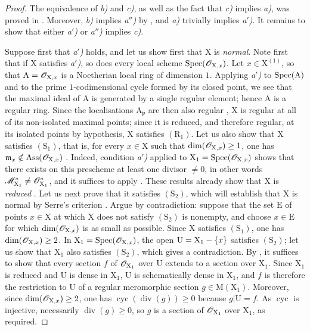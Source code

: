 \begin{proof}
The equivalence of \emph{b)} and \emph{c)}, as well as the fact that \emph{c)} implies \emph{a)}, was proved in .
Moreover, \emph{b)} implies \emph{a$''$)} by , and \emph{a)} trivially implies \emph{a$'$)}.
It remains to show that either \emph{a$'$)} or \emph{a$''$)} implies \emph{c)}.

Suppose first that \emph{a$'$)} holds, and let us show first that $\mathrm{X}$ is \emph{normal}.
Note first that if $\mathrm{X}$ satisfies \emph{a$'$)}, so does every local scheme $\operatorname{Spec}(\mathscr{O}_{\mathrm{X},x})$.
Let $x\in\mathrm{X}^{(1)}$, so that $\mathrm{A}=\mathscr{O}_{\mathrm{X},x}$ is a Noetherian local ring of dimension $1$.
Applying \emph{a$'$)} to $\operatorname{Spec}(\mathrm{A})$ and to the prime $1$-codimensional cycle formed by its closed point, we see that the maximal ideal of $\mathrm{A}$ is generated by a single regular element; hence  $\mathrm{A}$ is a regular ring.
Since the localisations $\mathrm{A}_{\mathfrak p}$ are then also regular , $\mathrm{X}$ is regular at all of its non-isolated maximal points; since it is reduced, and therefore regular, at its isolated points by hypothesis, $\mathrm{X}$ satisfies $(\mathrm{R}_1)$.
Let us also show that $\mathrm{X}$ satisfies $(\mathrm{S}_1)$, that is, for every $x\in\mathrm{X}$ such that $\dim(\mathscr{O}_{\mathrm{X},x})\geq 1$, one has $\mathfrak m_x\notin\operatorname{Ass}(\mathscr{O}_{\mathrm{X},x})$ .
Indeed, condition \emph{a$'$)} applied to $\mathrm{X}_1=\operatorname{Spec}(\mathscr{O}_{\mathrm{X},x})$ shows that there exists on this prescheme at least one divisor $\neq 0$, in other words $\mathscr{M}_{\mathrm{X}_1}^*\neq\mathscr{O}_{\mathrm{X}_1}^*$, and it suffices to apply .
These results already show that $\mathrm{X}$ is \emph{reduced} .
Let us next prove that it satisfies $(\mathrm{S}_2)$, which will establish that $\mathrm{X}$ is normal by Serre's criterion .
Argue by contradiction: suppose that the set $\mathrm{E}$ of points $x\in\mathrm{X}$ at which $\mathrm{X}$ does not satisfy $(\mathrm{S}_2)$ is nonempty, and choose $x\in\mathrm{E}$ for which $\dim(\mathscr{O}_{\mathrm{X},x})$ is as small as possible.
Since $\mathrm{X}$ satisfies $(\mathrm{S}_1)$, one has $\dim(\mathscr{O}_{\mathrm{X},x})\geq 2$.
In $\mathrm{X}_1=\operatorname{Spec}(\mathscr{O}_{\mathrm{X},x})$, the open $\mathrm{U}=\mathrm{X}_1-\{x\}$ satisfies $(\mathrm{S}_2)$; let us show that $\mathrm{X}_1$ also satisfies $(\mathrm{S}_2)$, which gives a contradiction.
By , it suffices to show that every section $f$ of $\mathscr{O}_{\mathrm{X}_1}$ over $\mathrm{U}$ extends to a section over $\mathrm{X}_1$.
Since $\mathrm{X}_1$ is reduced and $\mathrm{U}$ is dense in $\mathrm{X}_1$, $\mathrm{U}$ is schematically dense in $\mathrm{X}_1$, and $f$ is therefore the restriction to $\mathrm{U}$ of a regular meromorphic section $g\in\mathrm{M}(\mathrm{X}_1)$.
Moreover, since $\dim(\mathscr{O}_{\mathrm{X},x})\geq 2$, one has $\operatorname{cyc}(\operatorname{div}(g))\geq 0$ because $g|\mathrm{U}=f$.
As $\operatorname{cyc}$ is injective, necessarily $\operatorname{div}(g)\geq 0$, so  $g$ is a section of $\mathscr{O}_{\mathrm{X}_1}$ over $\mathrm{X}_1$, as required.


\end{proof}
